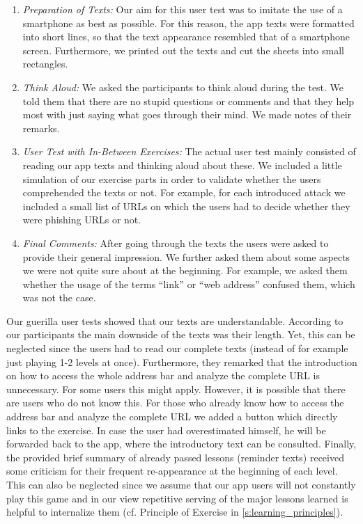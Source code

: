 \begin{enumerate}
	\item\textit{Preparation of Texts:} Our aim for this user test was to imitate the use of a smartphone as best as possible.
	For this reason, the app texts were formatted into short lines, so that the text appearance resembled that of a smartphone screen.
	Furthermore, we printed out the texts and cut the sheets into small rectangles.
	\item\textit{Think Aloud:} We asked the participants to think aloud during the test. 
	We told them that there are no stupid questions or comments and that they help most with just saying what goes through their mind.
	We made notes of their remarks.
	\item\textit{User Test with In-Between Exercises:} The actual user test mainly consisted of reading our app texts and thinking aloud about these.
	We included a little simulation of our exercise parts in order to validate whether the users comprehended the texts or not.
	For example, for each introduced attack we included a small list of URLs on which the users had to decide whether they were phishing URLs or not.
	\item\textit{Final Comments:} After going through the texts the users were asked to provide their general impression.
	We further asked them about some aspects we were not quite sure about at the beginning. 
	For example, we asked them whether the usage of the terms ``link'' or ``web address'' confused them, which was not the case.
\end{enumerate}
Our guerilla user tests showed that our texts are understandable.
According to our participants the main downside of the texts was their length. 
Yet, this can be neglected since the users had to read our complete texts (instead of for example just playing 1-2 levels at once). 
Furthermore, they remarked that the introduction on how to access the whole address bar and analyze the complete URL is unnecessary. 
For some users this might apply. 
However, it is possible that there are users who do not know this. 
For those who already know how to access the address bar and analyze the complete URL we added a button which directly links to the exercise. 
In case the user had overestimated himself, he will be forwarded back to the app, where the introductory text can be consulted. 
Finally, the provided brief summary of already passed lessons (reminder texts) received some criticism for their frequent re-appearance at the beginning of each level. 
This can also be neglected since we assume that our app users will not constantly play this game and in our view repetitive serving of the major lessons learned is helpful to internalize them (cf. Principle of Exercise in \autoref{s:learning_principles}). 
